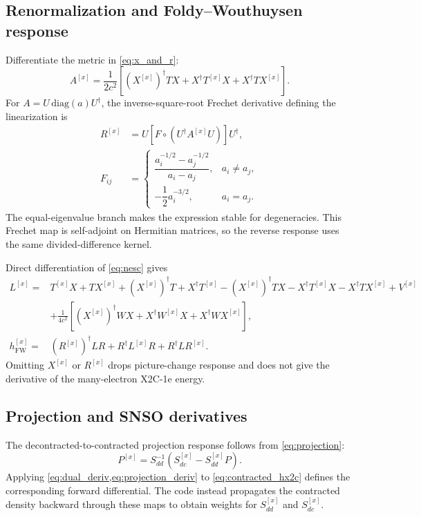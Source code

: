 \documentclass[aip,jcp,preprint]{revtex4-1}
\newcommand{\xcoord}{{[x]}}
\begin{document}
\subsection{Renormalization and Foldy--Wouthuysen response}

Differentiate the metric in \cref{eq:x_and_r}:
\begin{equation}
 A^\xcoord=\frac{1}{2c^2}\left[
 (X^\xcoord)^\dagger TX+X^\dagger T^\xcoord X
 +X^\dagger T X^\xcoord\right].
\end{equation}
For $A=U\,\mathrm{diag}(a)U^\dagger$, the inverse-square-root Frechet
derivative defining the linearization is
\begin{align}
 R^\xcoord
 &=U\left[F\circ(U^\dagger A^\xcoord U)\right]U^\dagger,\\
 F_{ij}
 &=\begin{cases}
 \dfrac{a_i^{-1/2}-a_j^{-1/2}}{a_i-a_j},&a_i\ne a_j,\\[6pt]
 -\dfrac{1}{2}a_i^{-3/2},&a_i=a_j.
 \end{cases}
 \label{eq:r_frechet}
\end{align}
The equal-eigenvalue branch makes the expression stable for degeneracies.
This Frechet map is self-adjoint on Hermitian matrices, so the reverse response
uses the same divided-difference kernel.

Direct differentiation of \cref{eq:nesc} gives
\begin{align}
 L^\xcoord={}&T^\xcoord X+TX^\xcoord
 +(X^\xcoord)^\dagger T+X^\dagger T^\xcoord
 -(X^\xcoord)^\dagger TX-X^\dagger T^\xcoord X-X^\dagger TX^\xcoord
 +V^\xcoord \nonumber\\
 &+\frac{1}{4c^2}\left[(X^\xcoord)^\dagger WX
 +X^\dagger W^\xcoord X+X^\dagger WX^\xcoord\right],
 \label{eq:l_deriv}\\
 h_\mathrm{FW}^\xcoord={}&
 (R^\xcoord)^\dagger LR+R^\dagger L^\xcoord R+R^\dagger LR^\xcoord.
 \label{eq:hfw_deriv}
\end{align}
Omitting $X^\xcoord$ or $R^\xcoord$ drops picture-change response and does not
give the derivative of the many-electron X2C-1e energy.\cite{ChengGauss2011}

\subsection{Projection and SNSO derivatives}

The decontracted-to-contracted projection response follows from
\cref{eq:projection}:
\begin{equation}
 P^\xcoord=S_{dd}^{-1}
 \left(S_{dc}^\xcoord-S_{dd}^\xcoord P\right).
 \label{eq:projection_deriv}
\end{equation}
Applying \cref{eq:dual_deriv,eq:projection_deriv} to
\cref{eq:contracted_hx2c} defines the corresponding forward differential.  The
code instead propagates the contracted density backward through these maps to
obtain weights for $S_{dd}^\xcoord$ and $S_{dc}^\xcoord$.
\end{document}
